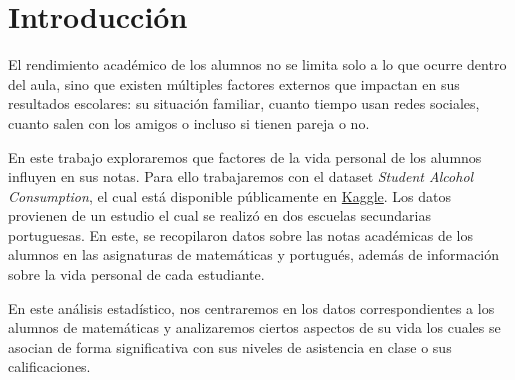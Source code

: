 \chapter{Introducción}

El rendimiento académico de los alumnos no se limita solo a lo que ocurre dentro del aula, sino que existen múltiples factores externos que impactan en sus resultados escolares: su situación familiar, cuanto tiempo usan redes sociales, cuanto salen con los amigos o incluso si tienen pareja o no.

En este trabajo exploraremos que factores de la vida personal de los alumnos influyen en sus notas. Para ello trabajaremos con el dataset \textit{Student Alcohol Consumption}, el cual está disponible públicamente en \href{https://www.kaggle.com/datasets/uciml/student-alcohol-consumption}{Kaggle}. Los datos provienen de un estudio \cite{Cortez2008} el cual se realizó en dos escuelas secundarias portuguesas. En este, se recopilaron datos sobre las notas académicas de los alumnos en las asignaturas de matemáticas y portugués, además de información sobre la vida personal de cada estudiante. 

En este análisis estadístico, nos centraremos en los datos correspondientes a los alumnos de matemáticas y analizaremos ciertos aspectos de su vida los cuales se asocian de forma significativa con sus niveles de asistencia en clase o sus calificaciones.

\pagebreak

